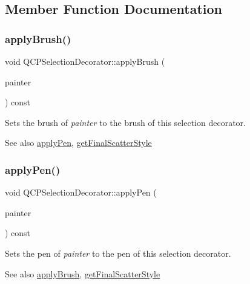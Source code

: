 \subsection{Member Function Documentation}
\mbox{\label{class_q_c_p_selection_decorator_a225544527d51b49546b70d0e6d655a34}} 
\subsubsection{\texorpdfstring{applyBrush()}{applyBrush()}}
{\footnotesize\ttfamily void Q\+C\+P\+Selection\+Decorator\+::apply\+Brush (\begin{DoxyParamCaption}\item[{\mbox{\hyperlink{class_q_c_p_painter}{Q\+C\+P\+Painter}} $\ast$}]{painter }\end{DoxyParamCaption}) const}

Sets the brush of {\itshape painter} to the brush of this selection decorator.

\begin{DoxySeeAlso}{See also}
\mbox{\hyperlink{class_q_c_p_selection_decorator_a75098893f7d08660ea449206810679d7}{apply\+Pen}}, \mbox{\hyperlink{class_q_c_p_selection_decorator_a1277b373248896bc70e8cc1de96da9fa}{get\+Final\+Scatter\+Style}} 
\end{DoxySeeAlso}
\mbox{\label{class_q_c_p_selection_decorator_a75098893f7d08660ea449206810679d7}} 
\subsubsection{\texorpdfstring{applyPen()}{applyPen()}}
{\footnotesize\ttfamily void Q\+C\+P\+Selection\+Decorator\+::apply\+Pen (\begin{DoxyParamCaption}\item[{\mbox{\hyperlink{class_q_c_p_painter}{Q\+C\+P\+Painter}} $\ast$}]{painter }\end{DoxyParamCaption}) const}

Sets the pen of {\itshape painter} to the pen of this selection decorator.

\begin{DoxySeeAlso}{See also}
\mbox{\hyperlink{class_q_c_p_selection_decorator_a225544527d51b49546b70d0e6d655a34}{apply\+Brush}}, \mbox{\hyperlink{class_q_c_p_selection_decorator_a1277b373248896bc70e8cc1de96da9fa}{get\+Final\+Scatter\+Style}} 
\end{DoxySeeAlso}
\mbox{\label{class_q_c_p_selection_decorator_a783b643aa52120a25308fc501b9998b1}} 
